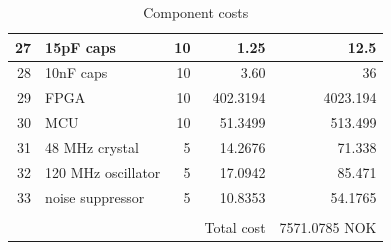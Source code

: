 \documentclass[../main/report.tex]{subfiles}
\begin{document}
\begin{table}[h]
\begin{tabular}{| r | l | r | r | r |}
        27 & 15pF caps & 10 & 1.25 & 12.5 \\\hline
        28 & 10nF caps & 10 & 3.60 & 36 \\\hline
        29 & FPGA & 10 & 402.3194 & 4023.194 \\\hline
        30 & MCU & 10 & 51.3499 & 513.499 \\\hline
        31 & 48 MHz crystal & 5 & 14.2676 & 71.338 \\\hline
        32 & 120 MHz oscillator & 5 & 17.0942 & 85.471 \\\hline
        33 & noise suppressor & 5 & 10.8353 & 54.1765 \\\hline
         & & & & \\\hline
         & & & Total cost & 7571.0785 NOK\\\hline
    \end{tabular}
    \label{fig:component-order}
    \caption{Component costs}
\end{table}
\end{document}
